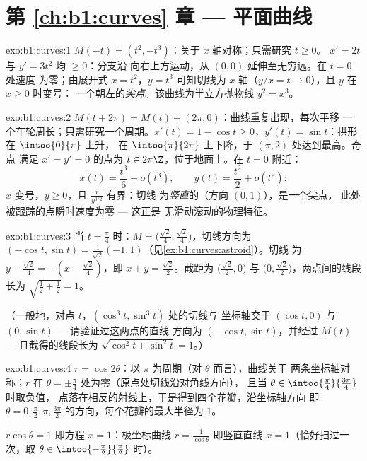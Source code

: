 \section*{第 \ref{ch:b1:curves} 章 --- 平面曲线}

\begin{solution}{exo:b1:curves:1}
$M(-t) = (t^2, -t^3)$：关于 $x$ 轴对称；只需研究 $t \geq 0$。
$x' = 2t$ 与 $y' = 3t^2$ 均 $\geq 0$：分支沿
向右上方运动，从 $(0,0)$ 延伸至无穷远。在 $t = 0$ 处速度
为零；由展开式 $x = t^2$，$y = t^3$ 可知切线为
$x$ 轴（$y/x = t \to 0$），且 $y$ 在 $x \geq 0$ 时变号：
一个朝左的\emph{尖点}。该曲线为半立方抛物线
$y^2 = x^3$。
\end{solution}

\begin{solution}{exo:b1:curves:2}
$M(t + 2\pi) = M(t) + (2\pi, 0)$：曲线重复出现，每次平移
一个车轮周长；只需研究一个周期。$x'(t) = 1 - \cos t \geq
0$，$y'(t) = \sin t$：拱形在 $\intoo{0}{\pi}$ 上升，
在 $\intoo{\pi}{2\pi}$ 上下降，于 $(\pi, 2)$ 处达到最高。奇点
满足 $x' = y' = 0$ 的点为 $t \in 2\pi\Z$，位于地面上。在 $t = 0$ 附近：
\[
x(t) = \frac{t^3}{6} + o(t^3),
\qquad
y(t) = \frac{t^2}{2} + o(t^2):
\]
$x$ 变号，$y \geq 0$，且 $\frac{x}{y^{3/2}}$ 有界：切线
为\emph{竖直}的（方向 $(0,1)$），是一个尖点，
此处被跟踪的点瞬时速度为零 --- 这正是
无滑动滚动的物理特征。
\end{solution}

\begin{solution}{exo:b1:curves:3}
当 $t = \frac\pi4$ 时：$M = \bigl(\frac{\sqrt2}{4},
\frac{\sqrt2}{4}\bigr)$，切线方向为 $(-\cos t, \sin t) =
\frac{1}{\sqrt2}(-1, 1)$（见\cref{ex:b1:curves:astroid}）。切线
为 $y - \frac{\sqrt2}{4} = -(x - \frac{\sqrt2}{4})$，即 $x +
y = \frac{\sqrt2}{2}$。截距为 $\bigl(\frac{\sqrt2}{2},
0\bigr)$ 与 $\bigl(0, \frac{\sqrt2}{2}\bigr)$，两点间的线段
长为 $\sqrt{\frac12 + \frac12} = 1$。

（一般地，对点 $t$，$(\cos^3 t, \sin^3 t)$ 处的切线与
坐标轴交于 $(\cos t, 0)$ 与 $(0, \sin t)$ --- 请验证过这两点的直线
方向为 $(-\cos t, \sin t)$，并经过
$M(t)$ --- 且截得的线段长为 $\sqrt{\cos^2 t +
\sin^2 t} = 1$。）
\end{solution}

\begin{solution}{exo:b1:curves:4}
$r = \cos 2\theta$：以 $\pi$ 为周期（对 $\theta$ 而言），曲线关于
两条坐标轴对称；$r$ 在 $\theta = \pm\frac\pi4$ 处为零（原点处切线沿对角线方向），
且当 $\theta \in
\intoo{\frac\pi4}{\frac{3\pi}{4}}$ 时取负值，
点落在相反的射线上，于是得到四个花瓣，沿坐标轴方向
即 $\theta = 0, \frac\pi2, \pi, \frac{3\pi}{2}$ 的方向，每个花瓣的最大半径为
$1$。

$r\cos\theta = 1$ 即方程 $x = 1$：极坐标曲线 $r =
\frac{1}{\cos\theta}$ 即竖直直线 $x = 1$（恰好扫过一次，取
$\theta \in \intoo{-\frac\pi2}{\frac\pi2}$ 时）。
\end{solution}

